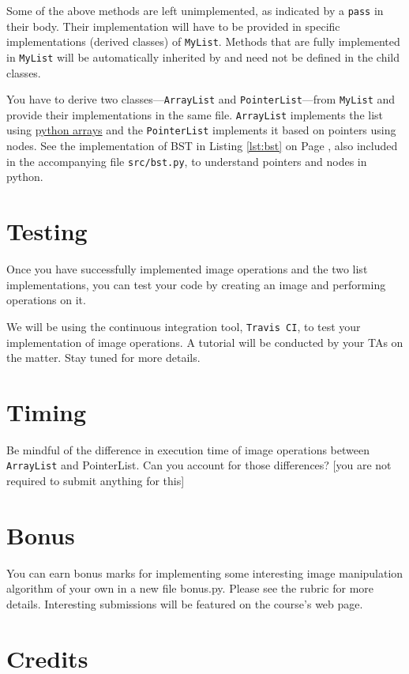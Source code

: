 \documentclass[addpoints]{exam}
\begin{document}
Some of the above methods are left unimplemented, as indicated by a \texttt{pass} in their body. Their implementation will have to be provided in specific implementations (derived classes) of \texttt{MyList}. Methods that are fully implemented in \texttt{MyList} will be automatically inherited by and need not be defined in the child classes.

You have to derive two classes---\texttt{ArrayList} and \texttt{PointerList}---from \texttt{MyList} and provide their implementations in the same file. \texttt{ArrayList} implements the list using \href{https://www.programiz.com/python-programming/array}{python arrays} and the \texttt{PointerList} implements it based on pointers using nodes. See the implementation of BST in Listing \ref{lst:bst} on Page \pageref{lst:bst}, also included in the accompanying file \texttt{src/bst.py}, to understand pointers and nodes in python. 

\section{Testing}

Once you have successfully implemented image operations and the two list implementations, you can test your code by creating an image and performing operations on it. 

We will be using the continuous integration tool, \texttt{Travis CI}, to test your implementation of image operations. A tutorial will be conducted by your TAs on the matter. Stay tuned for more details.

\section{Timing}

Be mindful of the difference in execution time of image operations between \texttt{ArrayList} and \textsf{PointerList}. Can you account for those differences? [you are not required to submit anything for this]

\section{Bonus}

You can earn bonus marks for implementing some interesting image manipulation algorithm of your own in a new file  \textsf{bonus.py}. Please see the rubric for more details. Interesting submissions will be featured on the course's web page.

\section{Credits}
\end{document}
